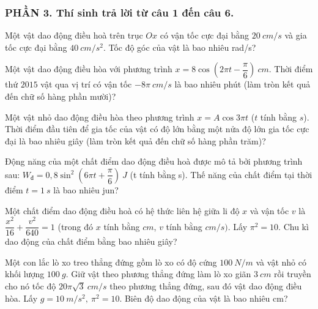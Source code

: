 \subsubsection*{PHẦN 3. Thí sinh trả lời từ câu 1 đến câu 6.}
\setcounter{ex}{0}
\begin{ex}
	Một vật dao động điều hoà trên trục $O x$ có vận tốc cực đại bằng $20 \ cm/s$ và gia tốc cực đại bằng $40\ cm/s^2$. Tốc độ góc của vật là bao nhiêu rad/s?
\end{ex}
\begin{ex}
	Một vật dao động điều hòa với phương trình $x=8 \cos \left(2 \pi t-\dfrac{\pi}{6}\right)\ cm$. Thời điểm thứ $2015$ vật qua vị trí có vận tốc $-8 \pi\ cm/s$ là bao nhiêu phút (làm tròn kết quả đến chữ số hàng phần mười)?
\end{ex}
\begin{ex}
	Một vật nhỏ dao động điều hòa theo phương trình $x=A \cos 3 \pi t$ ($t$ tính bằng $s$). Thời điểm đầu tiên để gia tốc của vật có độ lớn bằng một nửa độ lớn gia tốc cực đại là bao nhiêu giây (làm tròn kết quả đến chữ số hàng phần trăm)?
	 
\end{ex}
\begin{ex}
	Động năng của một chất điểm dao động điều hoà được mô tả bởi phương trình sau: $W_{\text{đ}}=0,8 \sin ^2\left(6 \pi t+\dfrac{\pi}{6}\right)\ J$ (t tính bằng s). Thế năng của chất điểm tại thời điểm $t=1 \ s$ là bao nhiêu jun?
\end{ex}
\begin{ex}
	Một chất điểm dao động điều hoà có hệ thức liên hệ giữa li độ $x$ và vận tốc $v$ là $\dfrac{x^2}{16}+\dfrac{v^2}{640}=1$ (trong đó $x$ tính bằng $cm$, $v$ tính bằng $cm/s)$. Lấy $\pi^2=10$. Chu kì dao động của chất điểm bằng bao nhiêu giây?
\end{ex}
\begin{ex}%
	Một con lắc lò xo treo thẳng đứng gồm lò xo có độ cứng $100\ N/m$ và vật nhỏ có khối lượng $100\ g$. Giữ vật theo phương thẳng đứng làm lò xo giãn $3\ cm$ rồi truyền cho nó tốc độ $20\pi \sqrt{3}\ cm/s$ theo phương thẳng đứng, sau đó vật dao động điều hòa. Lấy $g = 10\ m/s^2,\ \pi^2=10$. Biên độ dao động của vật là bao nhiêu cm?
\end{ex}